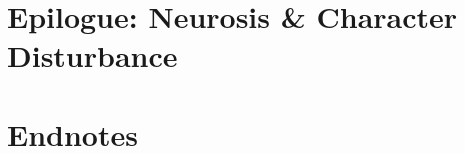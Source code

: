 \documentclass{article}
\numberwithin{equation}{section}
\begin{document}

\section{Epilogue: Neurosis \& Character Disturbance}


\section*{Endnotes}


\printbibliography[heading=bibintoc]
	
\end{document}
